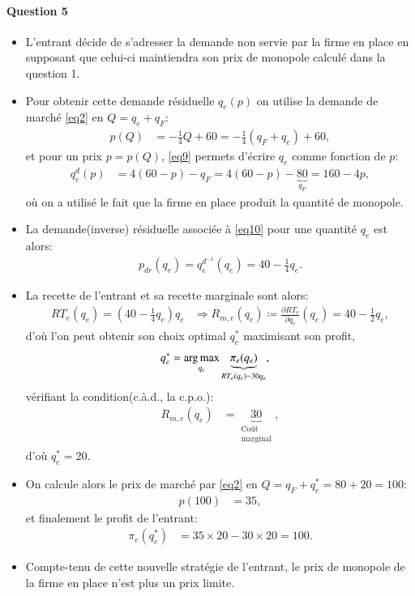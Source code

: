 \documentclass[notes, ignorenonframetext, compress, 9pt, xcolor=svgnames, aspectratio=169]{beamer}
\begin{document}
\begin{frame}
  [allowframebreaks]{\insertsection}
  \framesubtitle{Question 5}
  \begin{itemize}
    \item L'entrant décide de s'adresser la demande non servie par la firme en place
    en supposant que celui-ci maintiendra son prix de monopole calculé dans la question 1. 
    \item Pour obtenir cette demande résiduelle $q_e(p)$ on utilise la demande de marché \eqref{eq2}
    en $Q = q_e+q_F$:
    \begin{align}
      p(Q) &= -\frac{1}{4}Q + 60 =-\frac{1}{4}(q_F + q_e) + 60,
      \label{eq9}
    \end{align}
    et pour un prix $p = p(Q)$, \eqref{eq9} permets d'écrire $q_e$ comme fonction de $p$:
    \begin{align}
      q_e^d(p) &= 4(60-p) - q_F = 4(60-p) - \underbrace{80}_{q_F} =160-4p,
      \label{eq10}
    \end{align}
    où on a utilisé le fait que la firme en place produit la quantité de monopole.
    \item La demande(inverse) résiduelle associée à \eqref{eq10} pour une quantité $q_e$ est alors:
    \begin{align}
      p_{dr}(q_e) = q_e^{d^{-1}}(q_e) = 40-\frac{1}{4}q_e.
    \end{align}
    \item La recette de l'entrant et sa recette marginale sont alors:
    \begin{align*}
      RT_e(q_e) = (40-\frac{1}{4}q_e)q_e&\Rightarrow R_{m,e}(q_e) \coloneqq \frac{\partial RT_e}{\partial q_e}(q_e)
       = 40-\frac{1}{2}q_e, 
    \end{align*}
    d'où l'on peut obtenir son choix optimal $q_e^*$ maximisant son profit,
    \begin{align*}
      q_e^* &=\argmax_{q_e}\underbrace{\pi_e(q_e)}_{RT_e(q_e) - 30q_e},
    \end{align*}
    vérifiant la condition(c.à.d., la c.p.o.):
    \begin{align*}
      R_{m,e}(q_e) &= \underbrace{30}_{\substack{\text{Coût}\\\text{marginal}}},
    \end{align*}
    d'où $q_e^* = 20$.
    \item On calcule alors le prix de marché par \eqref{eq2} en $Q = q_F + q_e^* = 80 + 20= 100$:
    \begin{align*}
      p\left(100\right) &= 35,
    \end{align*}
    et finalement le profit de l'entrant:
    \begin{align*}
      \pi_e(q_e^*) &=  35 \times 20 - 30  \times 20=  100.
    \end{align*}
    \item Compte-tenu de cette nouvelle stratégie de l’entrant, 
    le prix de monopole de la firme en place n’est plus un prix limite.
  \end{itemize}
\end{frame}  
\end{document}
